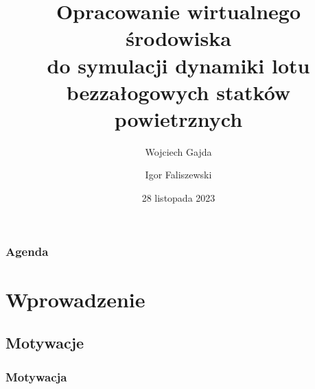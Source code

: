 \documentclass[aspectratio=169]{beamer}
\title{Opracowanie wirtualnego środowiska\\do symulacji dynamiki lotu\\ bezzałogowych statków powietrznych}
\author{Wojciech Gajda \and  Igor Faliszewski}
\date{28 listopada 2023} %
\begin{document}
\sloppy

{
\maketitleframe 
}

\begin{frame}
\frametitle{Agenda}
  \tableofcontents[  
    sectionstyle=show, 
    ]
\end{frame}

\section{Wprowadzenie}
\subsection{Motywacje}
\begin{frame}%
	\frametitle{Motywacja}
	\begin{columns}
		\begin{column}{0.33\textwidth}
	   	 	\begin{figure}
	   		 \centering
	    		\end{figure}
	    		\begin{figure}
	   		 \centering
	    		\end{figure}
		\end{column}
		\begin{column}{0.33\textwidth}
	   	 	\begin{figure}
	   		 \centering

\end{figure}
\end{column}
\end{columns}
\end{frame}
\end{document}
